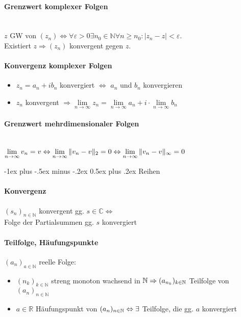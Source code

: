 \documentclass[paper=a3,paper=landscape, fontsize=9pt, DIV=30]{scrartcl}
\makeatletter
\newcommand{\real}{{\mathbb{R}}}
\newcommand{\compl}{\mathbb{C}}
\newcommand{\nat}{\mathbb{N}}
\newcommand{\aseq}{(a_n)_{n \in \nat}}
\newcommand{\srow}{(s_n)_{n \in \nat}}
\renewcommand{\section}{\@startsection{section}{1}{0mm}%
  {-1ex plus -.5ex minus -.2ex}%
  {0.5ex plus .2ex}%
  {\color{blue}\normalfont\large\bfseries}}
\makeatother
\begin{document}
\begin{multicols*}{4}
\paragraph{Grenzwert komplexer Folgen}\hspace{0pt} \\
$z$ GW von $(z_n) \Leftrightarrow \forall \varepsilon > 0 \exists n_0 \in \nat \forall n \geq n_0: |z_n - z| < \varepsilon$.\\Existiert $z \Rightarrow (z_n)$ konvergent gegen $z$.


\paragraph{Konvergenz komplexer Folgen}
\begin{itemize}
	\item $z_n = a_n + ib_n$ konvergiert $\Leftrightarrow$ $a_n$ und $b_n$ konvergieren
	\item $z_n$ konvergent $\Rightarrow \lim\limits_{n \rightarrow \infty} z_n = \lim\limits_{n \rightarrow \infty} a_n + i \cdot \lim\limits_{n \rightarrow \infty} b_n$
\end{itemize}


\paragraph{Grenzwert mehrdimensionaler Folgen}\hspace{0pt} \\
$\lim\limits_{n \rightarrow \infty} v_n = v \Leftrightarrow \lim\limits_{n \rightarrow \infty} \Arrowvert v_n - v\Arrowvert_2 = 0 \Leftrightarrow \lim\limits_{n \rightarrow \infty} \Arrowvert v_n - v\Arrowvert_\infty = 0 $

  \section{Reihen}

  \paragraph{Konvergenz}
  $\srow$ konvergent gg. $s \in \compl \Leftrightarrow$\\Folge der Partialsummen gg. $s$ konvergiert

  \paragraph{Teilfolge, Häufungspunkte}
  $(a_n)_{a \in \nat}$ reelle Folge:
  \begin{itemize}
  	\item $(n_k)_{k \in \nat}$ streng monoton wachsend in $\nat \\\Rightarrow (a_{n_k})_{k \in \nat}$ Teilfolge von $\aseq$
  	\item $a \in \real$ Häufungspunkt von $\aseq \Leftrightarrow\\\exists$ Teilfolge, die gg. $a$ konvergiert
  \end{itemize}


\end{multicols*}
\end{document}

